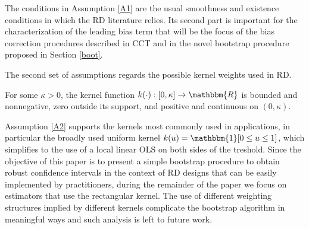 \documentclass[12pt,fleqn]{article}
\begin{document}
The conditions in Assumption \ref{A1} are the usual smoothness and existence conditions in which the RD literature relies. Its second part is important for the characterization of the leading bias term that will be the focus of the bias correction procedures described in CCT and in the novel  bootstrap procedure proposed in Section \ref{boot}.

The second set of assumptions regards the possible kernel weights used in RD.

\begin{assumption}\label{A2}
 For some $\kappa>0$, the kernel function $k(\cdot):[0, \kappa] \rightarrow \mathbbm{R}$ is bounded and nonnegative, zero outside its support, and positive and continuous on $(0, \kappa)$.
\end{assumption}

Assumption \ref{A2} supports the kernels most commonly used in applications, in particular the broadly used uniform kernel $k(u)=\mathbbm{1}[0\leq u\leq 1]$, which simplifies to the use of a local linear OLS on both sides of the treshold. Since the objective of this paper is to present a simple bootstrap procedure to obtain robust confidence intervals in the context of RD designs that can be easily implemented by practitioners, during the remainder of the paper we focus on estimators that use the rectangular kernel. The use of different weighting structures implied by different kernels complicate the bootstrap algorithm in meaningful ways and such analysis is left to future work.
\end{document}

